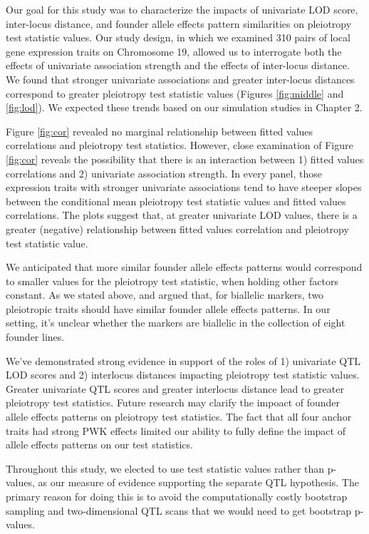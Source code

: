 \documentclass{book}
\begin{document}
Our goal for this study was to characterize the impacts of univariate LOD score, inter-locus distance, and founder allele effects pattern similarities on pleiotropy test statistic values. Our study design, in which we examined 310 pairs of local gene expression traits on Chromosome 19, allowed us to interrogate both the effects of univariate association strength and the effects of inter-locus distance. We found that stronger univariate associations and greater inter-locus distances correspond to greater pleiotropy test statistic values (Figures \ref{fig:middle} and \ref{fig:lod}). We expected these trends based on our simulation studies in Chapter 2.

Figure \ref{fig:cor} revealed no marginal relationship between fitted values correlations and pleiotropy test statistics. However, close examination of Figure \ref{fig:cor} reveals the possibility that there is an interaction between 1) fitted values correlations and 2) univariate association strength. In every panel, those expression traits with stronger univariate associations tend to have steeper slopes between the conditional mean pleiotropy test statistic values and fitted values correlations. The plots suggest that, at greater univariate LOD values, there is a greater (negative) relationship between fitted values correlation and pleiotropy test statistic value.

We anticipated that more similar founder allele effects patterns would correspond to smaller values for the pleiotropy test statistic, when holding other factors constant. As we stated above, \citet{macdonald2007joint} and \citet{king2012genetic} argued that, for biallelic markers, two pleiotropic traits should have similar founder allele effects patterns. In our setting, it's unclear whether the markers are biallelic in the collection of eight founder lines.

We've demonstrated strong evidence in support of the roles of 1) univariate QTL LOD scores and 2) interlocus distances impacting pleiotropy test statistic values. Greater univariate QTL scores and greater interlocus distance lead to greater pleiotropy test statistics. Future research may clarify the impoact of founder allele effects patterns on pleiotropy test statistics. The fact that all four anchor traits had strong PWK effects limited our ability to fully define the impact of allele effects patterns on our test statistics.

Throughout this study, we elected to use test statistic values rather than p-values, as our measure of evidence supporting the separate QTL hypothesis. The primary reason for doing this is to avoid the computationally costly bootstrap sampling and two-dimensional QTL scans that we would need to get bootstrap p-values.
\end{document}
